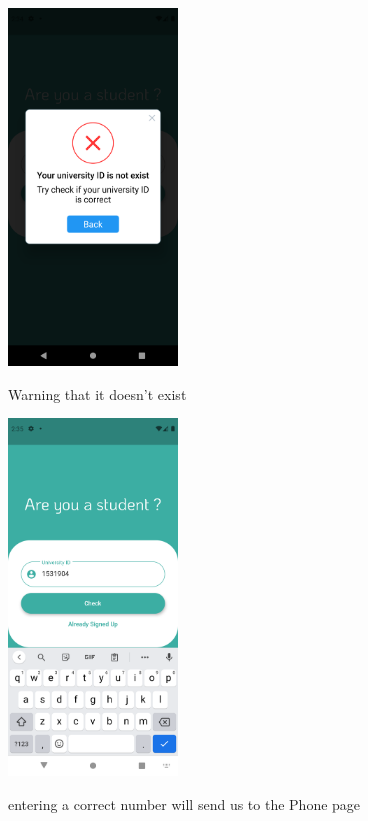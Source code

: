 \documentclass[12pt]{article}
\begin{document}
\begin{figure}[h!]
{\includegraphics[width=0.4\textwidth]{./Screenshots/4.PNG}}
  \caption{Warning that it doesn't exist}
\end{figure}



\begin{figure}[h!]
{\includegraphics[width=0.4\textwidth]{./Screenshots/5.PNG}}
  \caption{entering a correct number will send us to the Phone page}
\end{figure}
\end{document}
